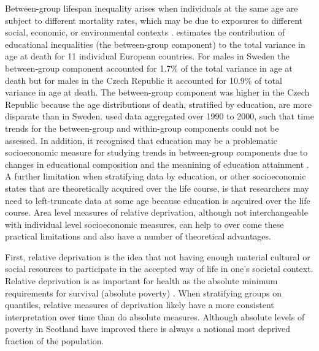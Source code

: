 \documentclass[12pt,oneside,a4paper]{article} %
\theoremstyle{definition}
\begin{document}
Between-group lifespan inequality arises when individuals at the same age are
subject to different mortality rates, which may be due to exposures to
different social, economic, or environmental contexts \citep{Hartemink2017}.
\citet{Raalte2012} estimates the contribution of educational inequalities (the
between-group component) to the total variance in age at death for 11 individual European countries. For males in Sweden the between-group component accounted for 1.7\% of the total variance in age at death but for males in the Czech Republic it accounted for 10.9\% of total variance in age at death. The between-group component was higher in the Czech Republic because the age distributions of death, stratified by education, are more disparate than in Sweden. 
\citet{Raalte2012} used data aggregated over 1990 to 2000, such
that time trends for the between-group and within-group components could not be assessed. 
In addition, it recognised that education may be a problematic socioeconomic
measure for studying trends in between-group components due to
changes in educational composition and the meanining of education attainment
\citep{Hendi2015}.
A further limitation when stratifying data by education, or other socioeconomic
states that are theoretically acquired over the life course, is that researchers
may need to left-truncate data at some age because education is aqcuired
over the life course. 
Area level measures of relative deprivation, although not interchangeable with individual level socioeconomic measures, can help to over come these practical limitations and also have a number of theoretical advantages.
 
First, relative deprivation is the idea that not having enough material cultural
or social resources to participate in the accepted way of life in one's societal
context. Relative deprivation is as important for health as the absolute
minimum requirements for survival (absolute poverty)
\citep{Townsend1987,Carstairs1989,Kearns2000,Kawachi2002}. When stratifying
groups on quantiles, relative measures of deprivation likely have a
more consistent interpretation over time than do absolute measures. Although
absolute levels of poverty in Scotland have improved there is always a notional
most deprived fraction of the population. 
\end{document}
